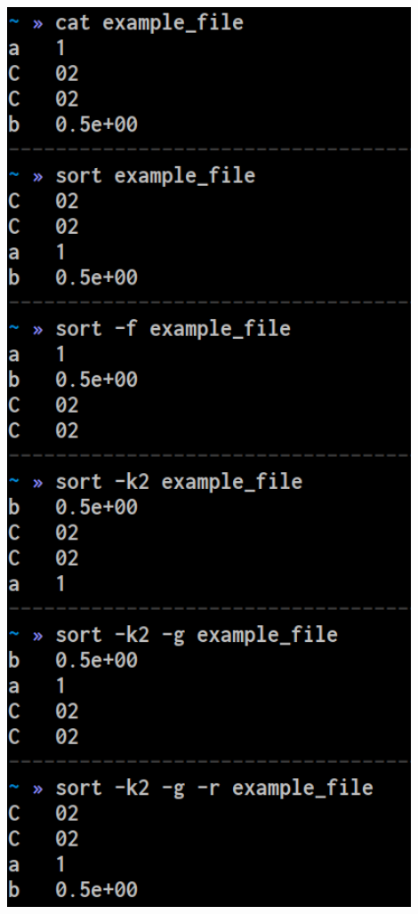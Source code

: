 \documentclass[unknownkeysallowed, 10pt, a4 paper, handout]{beamer}
\begin{document}
\begin{frame}
\begin{center}
{\begin{center}
        \includegraphics[width=0.90\textwidth]{pics/sort.png}
      \end{center}
    }
  \end{center}
\end{frame}
\end{document}

